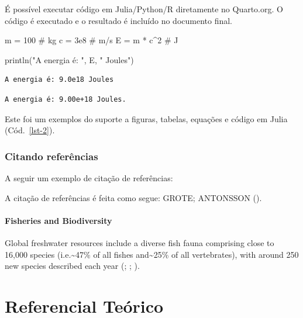 \documentclass[
  12pt,
  oneside,
  a4paper,
  english,
  brazil]{abntex2}
\newenvironment{Shaded}{}{}
\newcommand{\CommentTok}[1]{\textcolor[rgb]{0.42,0.45,0.49}{#1}}
\newcommand{\FloatTok}[1]{\textcolor[rgb]{0.00,0.36,0.77}{#1}}
\newcommand{\FunctionTok}[1]{\textcolor[rgb]{0.44,0.26,0.76}{#1}}
\newcommand{\NormalTok}[1]{\textcolor[rgb]{0.14,0.16,0.18}{#1}}
\newcommand{\OperatorTok}[1]{\textcolor[rgb]{0.14,0.16,0.18}{#1}}
\newcommand{\StringTok}[1]{\textcolor[rgb]{0.01,0.18,0.38}{#1}}
\begin{document}
É possível executar código em Julia/Python/R diretamente no Quarto.org.
O código é executado e o resultado é incluído no documento final.

\begin{Shaded}
\begin{Highlighting}[]
\NormalTok{m }\OperatorTok{=} \FloatTok{100} \CommentTok{\# kg}
\NormalTok{c }\OperatorTok{=} \FloatTok{3e8} \CommentTok{\# m/s}
\NormalTok{E }\OperatorTok{=}\NormalTok{ m }\OperatorTok{*}\NormalTok{ c}\OperatorTok{\^{}}\FloatTok{2} \CommentTok{\# J}

\FunctionTok{println}\NormalTok{(}\StringTok{"A energia é: "}\NormalTok{, E, }\StringTok{" Joules"}\NormalTok{)}
\end{Highlighting}
\end{Shaded}

\begin{verbatim}
A energia é: 9.0e18 Joules
\end{verbatim}

\begin{verbatim}
A energia é: 9.00e+18 Joules.
\end{verbatim}

Este foi um exemplos do suporte a figuras, tabelas, equações e código em
Julia (Cód.~\ref{lst-2}).

\subsection{Citando referências}\label{citando-referuxeancias}

A seguir um exemplo de citação de referências:

A citação de referências é feita como segue: GROTE; ANTONSSON
().

\subsubsection{Fisheries and
Biodiversity}\label{fisheries-and-biodiversity}

Global freshwater resources include a diverse fish fauna comprising
close to 16,000 species (i.e.\textasciitilde47\% of all fishes
and\textasciitilde25\% of all vertebrates), with around 250 new species
described each year (; ; ).

\chapter{Referencial Teórico}
\end{document}
